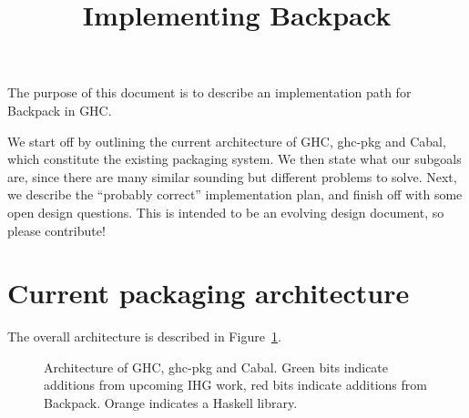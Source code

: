 \documentclass{article}
\title{Implementing Backpack}
\begin{document}
\maketitle

The purpose of this document is to describe an implementation path
for Backpack in GHC\@.

We start off by outlining the current architecture of GHC, ghc-pkg and Cabal,
which constitute the existing packaging system.  We then state what our subgoals
are, since there are many similar sounding but different problems to solve.  Next,
we describe the ``probably correct'' implementation plan, and finish off with
some open design questions.  This is intended to be an evolving design document,
so please contribute!

\tableofcontents

\section{Current packaging architecture}

The overall architecture is described in Figure~\ref{fig:arch}.

\begin{figure}[H]
\label{fig:arch}\caption{Architecture of GHC, ghc-pkg and Cabal. Green bits indicate additions from upcoming IHG work, red bits indicate additions from Backpack.  Orange indicates a Haskell library.}
\end{figure}
\end{document}
